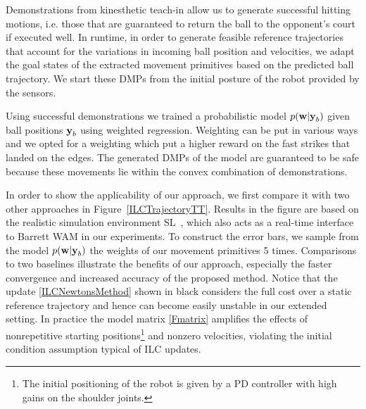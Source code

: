 Demonstrations from kinesthetic teach-in allow us to generate successful hitting motions, i.e. those that are guaranteed to return the ball to the opponent's court if executed well. In runtime, in order to generate feasible reference trajectories that account for the variations in incoming ball position and velocities, we adapt the goal states of the extracted movement primitives based on the predicted ball trajectory. We start these DMPs from the initial posture of the robot provided by the sensors.

Using successful demonstrations we trained a probabilistic model $p(\boldsymbol{\mathrm{w}}|\boldsymbol{\mathrm{y}}_b)$ given ball positions $\boldsymbol{\mathrm{y}}_b$ using weighted regression. Weighting can be put in various ways and we opted for a weighting which put a higher reward on the fast strikes that landed on the edges. The generated DMPs of the model are guaranteed to be safe because these movements lie within the convex combination of demonstrations. 



In order to show the applicability of our approach, we first compare it with two other approaches in Figure~\ref{ILCTrajectoryTT}. Results in the figure are based on the realistic simulation environment SL~\cite{Schaal06}, which also acts as a real-time interface to Barrett WAM in our experiments. To construct the error bars, we sample from the model $p(\boldsymbol{\mathrm{w}}|\boldsymbol{\mathrm{y}}_b)$ the weights of our movement primitives 5 times. Comparisons to two baselines illustrate the benefits of our approach, especially the faster convergence and increased accuracy of the proposed method. Notice that the update \eqref{ILCNewtonsMethod} shown in black considers the full cost over a static reference trajectory and hence can become easily unstable in our extended setting. In practice the model matrix \eqref{Fmatrix} amplifies the effects of nonrepetitive starting positions\footnote{The initial positioning of the robot is given by a PD controller with high gains on the shoulder joints.} and nonzero velocities, violating the initial condition assumption typical of ILC updates.

